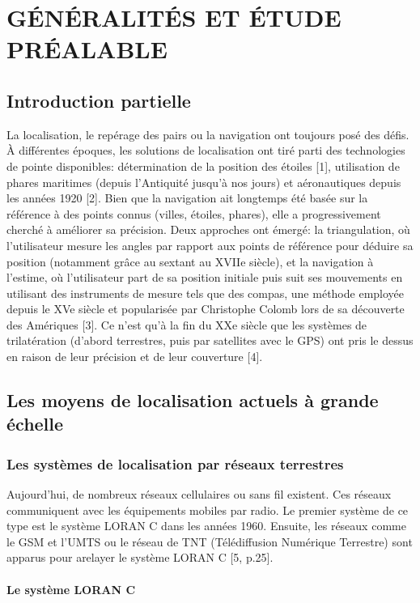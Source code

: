 \chapter{GÉNÉRALITÉS ET ÉTUDE PRÉALABLE}

\section{Introduction partielle}
La localisation, le repérage des pairs ou la navigation ont toujours posé des défis. À différentes époques, les solutions de localisation ont tiré parti des technologies de pointe disponibles: détermination de la position des étoiles [1], utilisation de phares maritimes (depuis l'Antiquité jusqu'à nos jours) et aéronautiques depuis les années 1920 [2]. Bien que la navigation ait longtemps été basée sur la référence à des points connus (villes, étoiles, phares), elle a progressivement cherché à améliorer sa précision. Deux approches ont émergé: la triangulation, où l'utilisateur mesure les angles par rapport aux points de référence pour déduire sa position (notamment grâce au sextant au XVIIe siècle), et la navigation à l'estime, où l'utilisateur part de sa position initiale puis suit ses mouvements en utilisant des instruments de mesure tels que des compas, une méthode employée depuis le XVe siècle et popularisée par Christophe Colomb lors de sa découverte des Amériques [3]. Ce n'est qu'à la fin du XXe siècle que les systèmes de trilatération (d'abord terrestres, puis par satellites avec le GPS) ont pris le dessus en raison de leur précision et de leur couverture [4].

\section{Les moyens de localisation actuels à grande échelle}

\subsection{Les systèmes de localisation par réseaux terrestres}
Aujourd’hui, de nombreux réseaux cellulaires ou sans fil existent. Ces réseaux communiquent avec les équipements mobiles par radio. Le premier système de ce type est le système LORAN C dans les années 1960. Ensuite, les réseaux comme le GSM et l’UMTS ou le réseau de TNT (Télédiffusion Numérique Terrestre) sont apparus pour arelayer le système LORAN C [5, p.25].

\subsubsection{Le système LORAN C}

